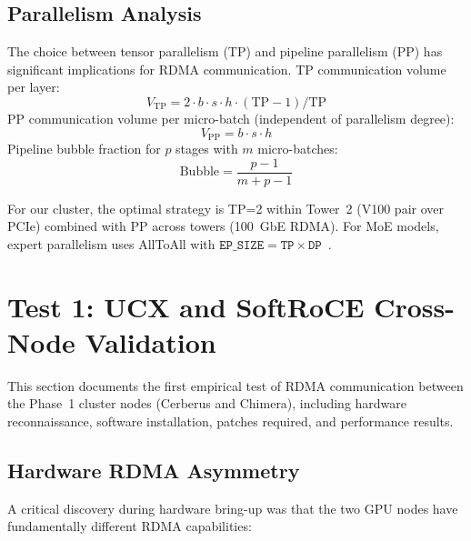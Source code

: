 \documentclass[11pt,letterpaper]{article}
\theoremstyle{definition}
\begin{document}
\subsection{Parallelism Analysis}

The choice between tensor parallelism (TP) and pipeline parallelism (PP) has significant implications for RDMA communication. TP communication volume per layer:
\begin{equation}
    V_{\text{TP}} = 2 \cdot b \cdot s \cdot h \cdot (\text{TP} - 1) / \text{TP}
\end{equation}
PP communication volume per micro-batch (independent of parallelism degree):
\begin{equation}
    V_{\text{PP}} = b \cdot s \cdot h
\end{equation}
Pipeline bubble fraction for $p$ stages with $m$ micro-batches:
\begin{equation}
    \text{Bubble} = \frac{p - 1}{m + p - 1}
\end{equation}

For our cluster, the optimal strategy is TP=2 within Tower~2 (V100 pair over PCIe) combined with PP across towers (100~GbE RDMA). For MoE models, expert parallelism uses AllToAll with $\texttt{EP\_SIZE} = \texttt{TP} \times \texttt{DP}$~\cite{amd-moe-guide}.

\section{Test 1: UCX and SoftRoCE Cross-Node Validation}
\label{sec:test1-ucx-softroce}

This section documents the first empirical test of RDMA communication between the Phase~1 cluster nodes (Cerberus and Chimera), including hardware reconnaissance, software installation, patches required, and performance results.

\subsection{Hardware RDMA Asymmetry}
\label{sec:test1-hardware}

A critical discovery during hardware bring-up was that the two GPU nodes have fundamentally different RDMA capabilities:
\end{document}

